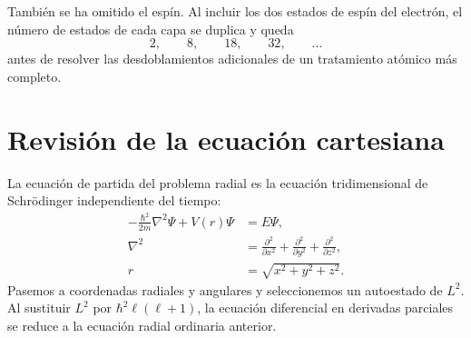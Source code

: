 También se ha omitido el espín. Al incluir los dos estados de espín del electrón, el número de estados de cada capa se duplica y queda
\begin{equation}
2,\qquad 8,\qquad 18,\qquad 32,\qquad \ldots
\end{equation}
antes de resolver las desdoblamientos adicionales de un tratamiento atómico más completo.

\section{Revisión de la ecuación cartesiana}

La ecuación de partida del problema radial es la ecuación tridimensional de Schr\"odinger independiente del tiempo:
\begin{equation}
\begin{aligned}
-\frac{\hbar^2}{2m}\nabla^2\Psi+V(r)\Psi&=E\Psi,\\
\nabla^2&=\frac{\partial^2}{\partial x^2}
+\frac{\partial^2}{\partial y^2}
+\frac{\partial^2}{\partial z^2},\\
r&=\sqrt{x^2+y^2+z^2}.
\end{aligned}
\end{equation}
Pasemos a coordenadas radiales y angulares y seleccionemos un autoestado de \(L^2\).
Al sustituir \(L^2\) por \(\hbar^2\ell(\ell+1)\), la ecuación diferencial en derivadas parciales se reduce a la ecuación radial ordinaria anterior.

\begin{classroomqa}
\end{classroomqa}

\begin{classroomqa}
\end{classroomqa}


